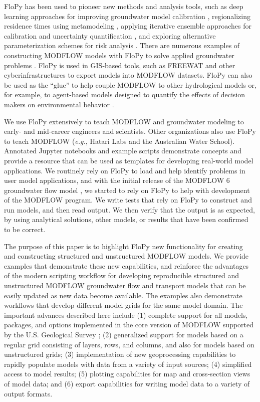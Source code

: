 \documentclass[12pt, oneside]{article}  	%
\begin{document}
FloPy has been used to pioneer new methods and analysis tools, such as deep learning approaches for improving groundwater model calibration \citep{sun2018, zhou2021}, regionalizing residence times using metamodeling \citep{starn2018}, applying iterative ensemble approaches for calibration and uncertainty quantification \citep{white2018ies}, and exploring alternative parameterization schemes for risk analysis \citep{knowling2019}. There are numerous examples of constructing MODFLOW models with FloPy to solve applied groundwater problems \citep{befus2017, vanengelen2018, ebeling2019, zipper2019, befus2020}. FloPy is used in GIS-based tools, such as FREEWAT \citep{freewat2018} and other cyberinfrastructures \citep{essawy2018} to export models into MODFLOW datasets. FloPy can also be used as the ``glue'' to help couple MODFLOW to other hydrological models \citep{burek2020} or, for example, to agent-based models designed to quantify the effects of decision makers on environmental behavior \citep{jaxarozen2019}. 

We use FloPy extensively to teach MODFLOW and groundwater modeling to early- and mid-career engineers and scientists. Other organizations also use FloPy to teach MODFLOW (\textit{e.g.}, Hatari Labs and the Australian Water School). Annotated Jupyter notebooks \citep{Kluyver:2016aa} and example scripts demonstrate concepts and provide a resource that can be used as templates for developing real-world model applications. We routinely rely on FloPy to load and help identify problems in user model applications, and with the initial release of the MODFLOW 6 groundwater flow model \citep{modflow6gwf}, we started to rely on FloPy to help with development of the MODFLOW program. We write tests that rely on FloPy to construct and run models, and then read output. We then verify that the output is as expected, by using analytical solutions, other models, or results that have been confirmed to be correct.

The purpose of this paper is to highlight FloPy new functionality for creating and constructing structured and unstructured MODFLOW models. We provide examples that demonstrate these new capabilities, and reinforce the advantages of the modern scripting workflow for developing reproducible structured and unstructured MODFLOW groundwater flow and transport models that can be easily updated as new data become available. The examples also demonstrate workflows that develop different model grids for the same model domain. The important advances described here include (1) complete support for all models, packages, and options implemented in the core version of MODFLOW supported by the U.S. Geological Survey \citep{modflow6framework, modflow6gwf, modflow6xt3d, langevin2020hydraulic, morway2021use, modflow6gwt, modflow6csub, modflow6lkt}; (2) generalized support for models based on a regular grid consisting of layers, rows, and columns, and also for models based on unstructured grids; (3) implementation of new geoprocessing capabilities to rapidly populate models with data from a variety of input sources; (4) simplified access to model results; (5) plotting capabilities for map and cross-section views of model data; and (6) export capabilities for writing model data to a variety of output formats.
\end{document}
